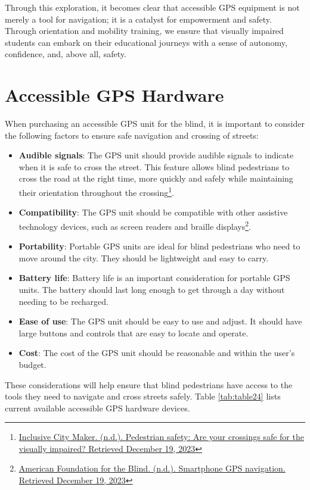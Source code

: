 Through this exploration, it becomes clear that accessible GPS equipment is not merely a tool for navigation; it is a catalyst for empowerment and safety. Through orientation and mobility training, we ensure that visually impaired students can embark on their educational journeys with a sense of autonomy, confidence, and, above all, safety.


\pagebreak \hypertarget{accessible-gps-mapping-hardware}{}\section{Accessible GPS Hardware}\label{accessible-gps-mapping-hardware}
When purchasing an accessible GPS unit for the blind, it is important to consider the following factors to ensure safe navigation and crossing of streets:
\begin{itemize}[leftmargin=*]
	\item \textbf{Audible signals}: The GPS unit should provide audible signals to indicate when it is safe to cross the street. This feature allows blind pedestrians to cross the road at the right time, more quickly and safely while maintaining their orientation throughout the crossing\footnote{\raggedright \href{http://www.inclusivecitymaker.com/pedestrian-safety-visually-impaired-blind-people/}{Inclusive City Maker. (n.d.). Pedestrian safety: Are your crossings safe for the visually impaired? Retrieved December 19, 2023}}.
	\item \textbf{Compatibility}: The GPS unit should be compatible with other assistive technology devices, such as screen readers and braille displays\footnote{\raggedright \href{http://www.afb.org/blindness-and-low-vision/using-technology/smartphone-gps-navigation-people-visual-impairments}{American Foundation for the Blind. (n.d.). Smartphone GPS navigation. Retrieved December 19, 2023}}.
	\item \textbf{Portability}: Portable GPS units are ideal for blind pedestrians who need to move around the city. They should be lightweight and easy to carry.
	\item \textbf{Battery life}: Battery life is an important consideration for portable GPS units. The battery should last long enough to get through a day without needing to be recharged.
	\item \textbf{Ease of use}: The GPS unit should be easy to use and adjust. It should have large buttons and controls that are easy to locate and operate.
	\item \textbf{Cost}: The cost of the GPS unit should be reasonable and within the user’s budget.
\end{itemize}
These considerations will help ensure that blind pedestrians have access to the tools they need to navigate and cross streets safely. Table \ref{tab:table24} lists current available accessible GPS hardware devices.

